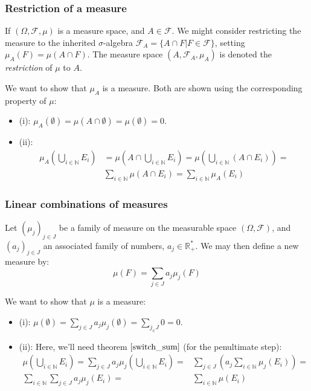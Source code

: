 \documentclass[12pt, a4paper]{article}
\numberwithin{equation}{section}
\begin{document}
\subsubsection{Restriction of a measure}
\label{restriction_of_measure}
If $(\Omega,\mathcal{F},\mu)$ is a measure space, and $A\in\mathcal{F}$. We might consider restricting the measure to the inherited $\sigma$-algebra $\mathcal{F}_A=\{A\cap F|F\in\mathcal{F}\}$, setting $\mu_A(F)=\mu(A\cap F)$. The measure space $(A,\mathcal{F}_A,\mu_A)$ is denoted the \textit{restriction} of $\mu$ to $A$.

We want to show that $\mu_A$ is a measure. Both are shown using the corresponding property of $\mu$:
\begin{itemize}
\item (i): $\mu_A(\emptyset)=\mu(A\cap\emptyset)=\mu(\emptyset)=0$.
\item (ii): 
\begin{align*}
\mu_A\left(\bigcup_{i\in\mathbb{N}} E_i\right)&=\mu\left(A\cap\bigcup_{i\in\mathbb{N}} E_i\right)=\mu\left(\bigcup_{i\in\mathbb{N}}(A\cap E_i)\right)=\\
&\sum_{i\in\mathbb{N}}\mu(A\cap E_i)=\sum_{i\in\mathbb{N}}\mu_A(E_i)
\end{align*}
\end{itemize}

\subsubsection{Linear combinations of measures}
\label{linear_combination_measure}
Let $(\mu_j)_{j\in J}$ be a family of measure on the measurable space $(\Omega,\mathcal{F})$, and $(a_j)_{j\in J}$ an associated family of numbers, $a_j\in\mathbb{R}^*_+$. We may then define a new measure by:
\begin{equation}
\mu(F)=\sum_{j\in J}a_j\mu_j(F)
\end{equation}

We want to show that $\mu$ is a measure:
\begin{itemize}
\item (i): $\mu(\emptyset)=\sum_{j\in J} a_j\mu_j(\emptyset)=\sum_{j_\in J}0=0$.
\item (ii): Here, we'll need theorem $\ref{switch_sum}$ (for the penultimate step):
\begin{align*}
\mu\left(\bigcup_{i\in\mathbb{N}} E_i\right)=\sum_{j\in J} a_j\mu_j\left(\bigcup_{i\in\mathbb{N}} E_i\right)=&\sum_{j\in J}\left(a_j\sum_{i\in\mathbb{N}}\mu_j(E_i)\right)=\\
\sum_{i\in\mathbb{N}}\sum_{j\in J}a_j\mu_j(E_i)=&\sum_{i\in\mathbb{N}}\mu(E_i)
\end{align*}
\end{itemize}
\end{document}
